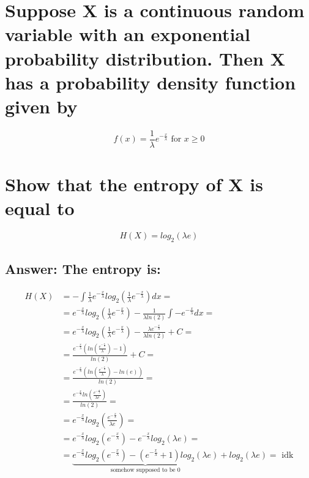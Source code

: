 \documentclass[15px]{article}
\begin{document}
\section{Suppose X is a continuous random variable with an exponential probability distribution. Then X has a probability density function given by}
\begin{equation}
f(x) = \frac{1}{\lambda}e^{-\frac{x}{\lambda}} \text{ for } x \geq 0
\end{equation}
\section*{Show that the entropy of X is equal to}
\begin{equation}
H(X) = log_2(\lambda e)
\end{equation}

\subsection*{Answer: The entropy is:}

\begin{equation}
\begin{split}
H(X) & = -\int \frac{1}{\lambda}e^{-\frac{x}{\lambda}}log_2(\frac{1}{\lambda}e^{-\frac{x}{\lambda}}) dx = \\
& = e^{-\frac{x}{\lambda}} log_2(\frac{1}{\lambda}e^{-\frac{x}{\lambda}})  - \frac{1}{\lambda ln(2)}\int -e^{-\frac{x}{\lambda}} dx = \\
& = e^{-\frac{x}{\lambda}} log_2(\frac{1}{\lambda}e^{-\frac{x}{\lambda}}) - \frac{\lambda e^{-\frac{x}{\lambda}}}{\lambda ln(2)} + C = \\
& = \frac{e^{-\frac{x}{\lambda}}(ln(\frac{e^{-\frac{x}{\lambda}}}{\lambda}) - 1)}{ln(2)} + C = \\ 
& = \frac{e^{-\frac{x}{\lambda}}(ln(\frac{e^{-\frac{x}{\lambda}}}{\lambda}) - ln(e))}{ln(2)} = \\ 
& = \frac{e^{-\frac{x}{\lambda}}ln(\frac{e^{-\frac{x}{\lambda}}}{\lambda e})}{ln(2)} = \\ 
& = e^{-\frac{x}{\lambda}}log_2(\frac{e^{-\frac{x}{\lambda}}}{\lambda e}) =\\ 
& = e^{-\frac{x}{\lambda}}log_2(e^{-\frac{x}{\lambda}}) - e^{-\frac{x}{\lambda}}log_2(\lambda e) =\\ 
& = \underbrace{e^{-\frac{x}{\lambda}}log_2(e^{-\frac{x}{\lambda}}) - (e^{-\frac{x}{\lambda}} + 1)log_2(\lambda e)}_\text{somehow supposed to be 0} + log_2(\lambda e)= \text{ idk}
\end{split}
\end{equation}
\end{document}
